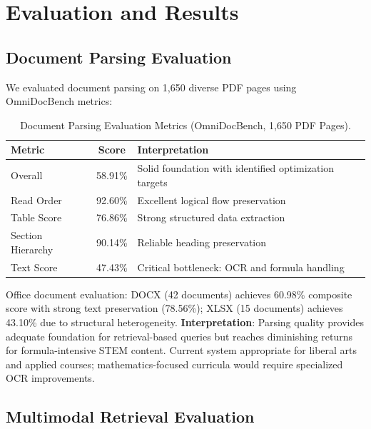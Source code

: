 \documentclass[11pt,a4paper,twocolumn]{article}
\begin{document}
\section{Evaluation and Results}

\subsection{Document Parsing Evaluation}

We evaluated document parsing on 1,650 diverse PDF pages using OmniDocBench metrics:

\begin{table}[t]
\caption{Document Parsing Evaluation Metrics (OmniDocBench, 1,650 PDF Pages).}
\label{tab:parsing-metrics}
\centering
\begin{tabular}{lcp{5.5cm}}
\toprule
\textbf{Metric} & \textbf{Score} & \textbf{Interpretation} \\
\midrule
Overall & 58.91\% & Solid foundation with identified optimization targets \\
Read Order & 92.60\% & Excellent logical flow preservation \\
Table Score & 76.86\% & Strong structured data extraction \\
Section Hierarchy & 90.14\% & Reliable heading preservation \\
Text Score & 47.43\% & Critical bottleneck: OCR and formula handling \\
\bottomrule
\end{tabular}
\end{table}

Office document evaluation: DOCX (42 documents) achieves 60.98\% composite score with strong text preservation (78.56\%); XLSX (15 documents) achieves 43.10\% due to structural heterogeneity. \textbf{Interpretation}: Parsing quality provides adequate foundation for retrieval-based queries but reaches diminishing returns for formula-intensive STEM content. Current system appropriate for liberal arts and applied courses; mathematics-focused curricula would require specialized OCR improvements.

\subsection{Multimodal Retrieval Evaluation}
\end{document}

